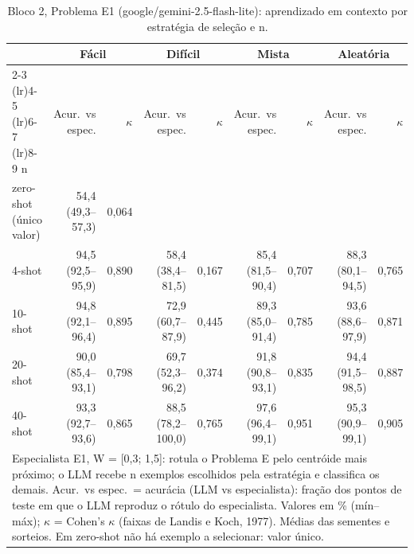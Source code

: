 \begin{table}[htbp]
\centering
\small
\caption{Bloco 2, Problema E1 (google/gemini-2.5-flash-lite): aprendizado em contexto por estratégia de seleção e n.}
\label{tab:bloco2_E1_faseE_estrategia_x_nshot_flashlite}
\begin{tabular}{lrrrrrrrr}
\toprule
 & \multicolumn{2}{c}{Fácil} & \multicolumn{2}{c}{Difícil} & \multicolumn{2}{c}{Mista} & \multicolumn{2}{c}{Aleatória} \\ \cmidrule(lr){2-3} \cmidrule(lr){4-5} \cmidrule(lr){6-7} \cmidrule(lr){8-9}
n & Acur.\ vs espec. & $\kappa$ & Acur.\ vs espec. & $\kappa$ & Acur.\ vs espec. & $\kappa$ & Acur.\ vs espec. & $\kappa$ \\
\midrule
zero-shot (único valor) & 54,4 (49,3–57,3) & 0,064 &  &  &  &  &  &  \\
4-shot & 94,5 (92,5–95,9) & 0,890 & 58,4 (38,4–81,5) & 0,167 & 85,4 (81,5–90,4) & 0,707 & 88,3 (80,1–94,5) & 0,765 \\
10-shot & 94,8 (92,1–96,4) & 0,895 & 72,9 (60,7–87,9) & 0,445 & 89,3 (85,0–91,4) & 0,785 & 93,6 (88,6–97,9) & 0,871 \\
20-shot & 90,0 (85,4–93,1) & 0,798 & 69,7 (52,3–96,2) & 0,374 & 91,8 (90,8–93,1) & 0,835 & 94,4 (91,5–98,5) & 0,887 \\
40-shot & 93,3 (92,7–93,6) & 0,865 & 88,5 (78,2–100,0) & 0,765 & 97,6 (96,4–99,1) & 0,951 & 95,3 (90,9–99,1) & 0,905 \\
\bottomrule
\multicolumn{9}{p{0.95\linewidth}}{\footnotesize Especialista E1, W = [0,3; 1,5]: rotula o Problema E pelo centróide mais próximo; o LLM recebe n exemplos escolhidos pela estratégia e classifica os demais. Acur.\ vs espec.\ = acurácia (LLM vs especialista): fração dos pontos de teste em que o LLM reproduz o rótulo do especialista. Valores em \% (mín–máx); $\kappa$ = Cohen's $\kappa$ (faixas de Landis e Koch, 1977). Médias das sementes e sorteios. Em zero-shot não há exemplo a selecionar: valor único.} \\
\end{tabular}
\end{table}
